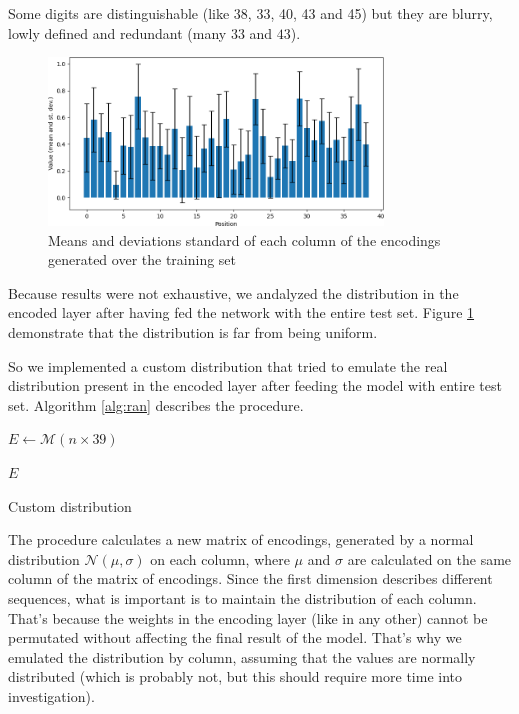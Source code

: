 \documentclass[compsoc]{IEEEtran}
\begin{document}
Some digits are distinguishable (like 38, 33, 40, 43 and 45) but they are blurry, lowly defined and redundant (many $33$ and $43$).

\begin{figure}[ht!]
\centering                                                                        
\includegraphics[width=3.5in]{enco.png}
\captionsetup{justification=centering}
\caption{Means and deviations standard of each column of the encodings generated over the training set}
\label{fig:enco}
\end{figure}

Because results were not exhaustive, we andalyzed the distribution in the encoded layer after having fed the network with the entire
test set. Figure \ref{fig:enco} demonstrate that the distribution is far from being uniform.


So we implemented a custom distribution that tried to emulate the real distribution
present in the encoded layer after feeding the model with entire test set. Algorithm \ref{alg:ran} describes the procedure.

\begin{algorithm}[h]
\SetAlgoLined
{}

$E \gets \mathcal{M}(n \times 39)$\;



\Return $E$\;

\caption{Custom distribution}\label{alg:ran}
\end{algorithm}

The procedure calculates a new matrix of encodings, generated by a normal distribution $\mathcal{N}(\mu, \sigma)$ on each column, where $\mu$ and $\sigma$ are calculated on the same column of the matrix of encodings. Since the first dimension describes different sequences, what is important is to maintain the distribution
of each column. That's because the weights in the encoding layer (like in any other) cannot be permutated without affecting the final result of the model. That's why we emulated the distribution by column, assuming that the values are normally distributed (which is probably not, but this should require more time into investigation). 
\end{document}
